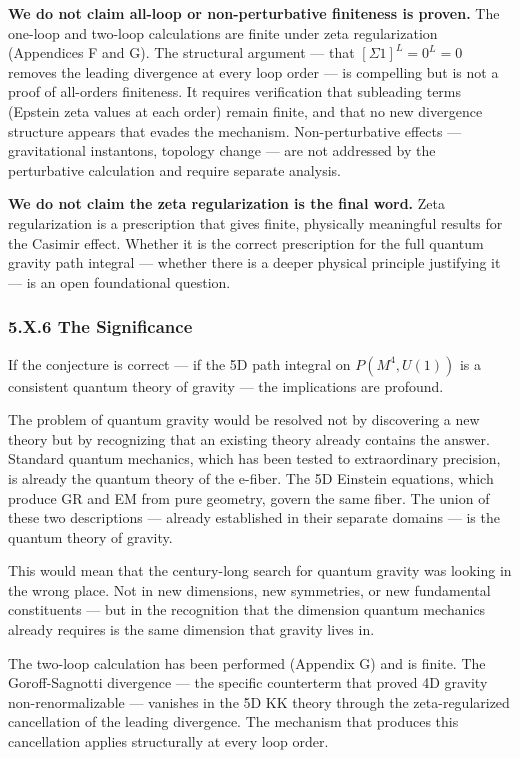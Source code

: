 \documentclass[aps,prd,preprint,superscriptaddress,longbibliography,floatfix]{revtex4-2}
\theoremstyle{remark}
\begin{document}
\textbf{We do not claim all-loop or non-perturbative finiteness is proven.} The one-loop and two-loop calculations are finite under zeta regularization (Appendices F and G). The structural argument --- that $[\Sigma 1]^L = 0^L = 0$ removes the leading divergence at every loop order --- is compelling but is not a proof of all-orders finiteness. It requires verification that subleading terms (Epstein zeta values at each order) remain finite, and that no new divergence structure appears that evades the mechanism. Non-perturbative effects --- gravitational instantons, topology change --- are not addressed by the perturbative calculation and require separate analysis.

\textbf{We do not claim the zeta regularization is the final word.} Zeta regularization is a prescription that gives finite, physically meaningful results for the Casimir effect. Whether it is the correct prescription for the full quantum gravity path integral --- whether there is a deeper physical principle justifying it --- is an open foundational question.



\subsubsection{5.X.6 The Significance}

If the conjecture is correct --- if the 5D path integral on $P(M^{4}, U(1))$ is a consistent quantum theory of gravity --- the implications are profound.

The problem of quantum gravity would be resolved not by discovering a new theory but by recognizing that an existing theory already contains the answer. Standard quantum mechanics, which has been tested to extraordinary precision, is already the quantum theory of the e-fiber. The 5D Einstein equations, which produce GR and EM from pure geometry, govern the same fiber. The union of these two descriptions --- already established in their separate domains --- is the quantum theory of gravity.

This would mean that the century-long search for quantum gravity was looking in the wrong place. Not in new dimensions, new symmetries, or new fundamental constituents --- but in the recognition that the dimension quantum mechanics already requires is the same dimension that gravity lives in.

The two-loop calculation has been performed (Appendix G) and is finite. The Goroff-Sagnotti divergence --- the specific counterterm that proved 4D gravity non-renormalizable --- vanishes in the 5D KK theory through the zeta-regularized cancellation of the leading divergence. The mechanism that produces this cancellation applies structurally at every loop order.
\end{document}
